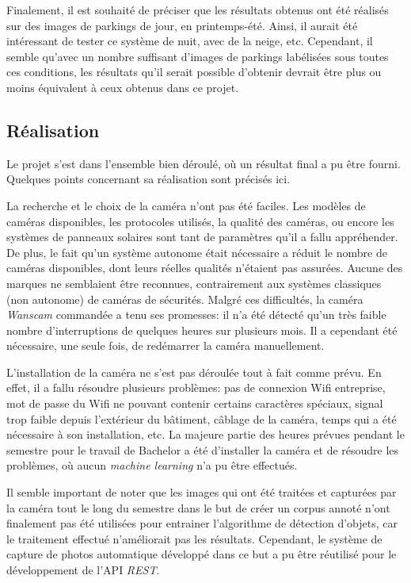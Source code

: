 Finalement, il est souhaité de préciser que les résultats obtenus ont été réalisés sur des images de parkings de jour, en printemps-été. Ainsi, il aurait été intéressant de tester ce système de nuit, avec de la neige, etc. Cependant, il semble qu'avec un nombre suffisant d'images de parkings labélisées sous toutes ces conditions, les résultats qu'il serait possible d'obtenir devrait être plus ou moins équivalent à ceux obtenus dans ce projet. 

\subsection{Réalisation}

Le projet s'est dans l'ensemble bien déroulé, où un résultat final a pu être fourni. Quelques points concernant sa réalisation sont précisés ici.

La recherche et le choix de la caméra n'ont pas été faciles. Les modèles de caméras disponibles, les protocoles utilisés, la qualité des caméras, ou encore les systèmes de panneaux solaires sont tant de paramètres qu'il a fallu appréhender. De plus, le fait qu'un système autonome était nécessaire a réduit le nombre de caméras disponibles, dont leurs réelles qualités n'étaient pas assurées. Aucune des marques ne semblaient être reconnues, contrairement aux systèmes classiques (non autonome) de caméras de sécurités. Malgré ces difficultés, la caméra \textit{Wanscam} commandée a tenu ses promesses: il n'a été détecté qu'un très faible nombre d'interruptions de quelques heures sur plusieurs mois. Il a cependant été nécessaire, une seule fois, de redémarrer la caméra manuellement.

L'installation de la caméra ne s'est pas déroulée tout à fait comme prévu. En effet, il a fallu résoudre plusieurs problèmes: pas de connexion Wifi entreprise, mot de passe du Wifi ne pouvant contenir certains caractères spéciaux, signal trop faible depuis l'extérieur du bâtiment, câblage de la caméra, temps qui a été nécessaire à son installation, etc. La majeure partie des heures prévues pendant le semestre pour le travail de Bachelor a été d'installer la caméra et de résoudre les problèmes, où aucun \textit{machine learning} n'a pu être effectués.

Il semble important de noter que les images qui ont été traitées et capturées par la caméra tout le long du semestre dans le but de créer un corpus annoté n'ont finalement pas été utilisées pour entrainer l'algorithme de détection d'objets, car le traitement effectué n'améliorait pas les résultats. Cependant, le système de capture de photos automatique développé dans ce but a pu être réutilisé pour le développement de l'API \textit{REST}.


